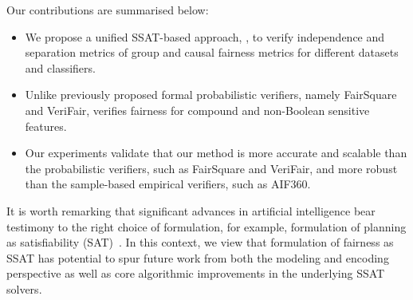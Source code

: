 
Our contributions are summarised below:
\begin{itemize}
	\item We propose a unified SSAT-based approach, {\justicia}, to verify independence and separation metrics of group and causal fairness metrics for different datasets and classifiers.
	\item Unlike previously proposed formal probabilistic verifiers, namely FairSquare and VeriFair, {\justicia} verifies fairness for compound and non-Boolean sensitive features.%
	\item Our experiments validate that our method is more accurate and scalable than the probabilistic verifiers, such as FairSquare and VeriFair, and more robust than the sample-based empirical verifiers, such as AIF360.
\end{itemize}

It is worth remarking that significant advances in artificial intelligence bear testimony to the right choice of formulation, for example, formulation of planning as satisfiability (SAT)~\cite{kautz1992planning}. In this context, we view that formulation of fairness as SSAT has potential to spur future work from both the modeling and encoding perspective as well as core algorithmic improvements in the underlying SSAT solvers. 

